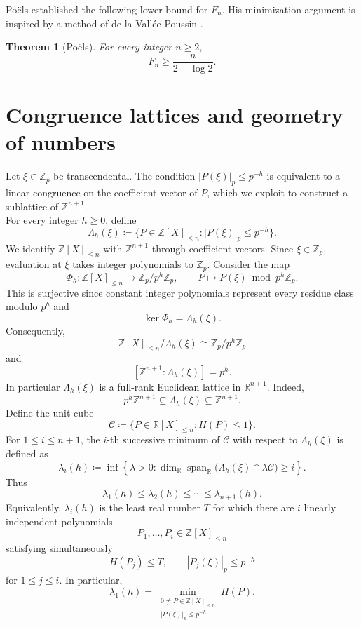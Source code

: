 \documentclass[10pt,a4paper]{amsart}
\newtheorem{theorem}{Theorem}[section]
\newcommand{\Z}{\mathbb Z}
\newcommand{\R}{\mathbb R}
\newcommand{\Zp}{\mathbb Z_p}
\newcommand{\Span}{\operatorname{span}}
\begin{document}
Po\"els \cite[Theorem~8.1]{PoelsWirsing} established the following lower
bound for $F_n$. His minimization argument is inspired by a method of de la
Vall\'ee Poussin \cite[Chapter~VI]{ValleePoussin}.
\begin{theorem}[Po\"els]\label{thm:optimization}
For every integer $n\geq2$,
$$
F_n\geq\frac{n}{2-\log 2}.
$$
\end{theorem}

\bigskip

\section{\bf Congruence lattices and geometry of numbers}
\bigskip


Let $\xi\in\Zp$ be transcendental. The condition
$|P(\xi)|_p\leq p^{-h}$ is equivalent to a linear congruence on the
coefficient vector of $P$, which we exploit to construct a sublattice of $\Z^{n+1}$.\\ 

For every integer $h\geq0$, define
$$
\Lambda_h(\xi)
\coloneqq
\{P\in\Z[X]_{\leq n}:|P(\xi)|_p\leq p^{-h}\}.
$$
We identify $\Z[X]_{\leq n}$ with $\Z^{n+1}$ through coefficient vectors. Since $\xi\in\Zp$, evaluation at $\xi$ takes integer polynomials to $\Zp$. Consider the map 
$$
\Phi_h:\Z[X]_{\leq n}\longrightarrow\Zp/p^h\Zp,
\qquad
P\longmapsto P(\xi)\bmod p^h\Zp.
$$
This is surjective since constant integer polynomials represent every residue class modulo $p^h$ and
$$
\ker\Phi_h=\Lambda_h(\xi).
$$
Consequently,
$$
\Z[X]_{\leq n}/\Lambda_h(\xi)
\cong
\Zp/p^h\Zp
$$
and
$$
[\Z^{n+1}:\Lambda_h(\xi)]=p^h.
$$
In particular $\Lambda_h(\xi)$ is a full-rank Euclidean lattice in $\R^{n+1}$. Indeed,
$$
p^h\Z^{n+1}\subseteq\Lambda_h(\xi)\subseteq\Z^{n+1}.
$$
Define the unit cube
$$
\mathcal C
\coloneqq
\{P\in\R[X]_{\leq n}:H(P)\leq 1\}.
$$
For $1\leq i\leq n+1$, the $i$-th successive minimum of $\mathcal C$ with respect to $\Lambda_h(\xi)$ is defined as
$$
\lambda_i(h)
\coloneqq
\inf\left\{
\lambda>0:
\dim_{\R}\Span_{\R}\bigl(\Lambda_h(\xi)\cap\lambda\mathcal C\bigr)\geq i
\right\}.
$$
Thus
$$
\lambda_1(h)\leq\lambda_2(h)\leq\cdots\leq\lambda_{n+1}(h).
$$
Equivalently, $\lambda_i(h)$ is the least real number $T$ for which there are $i$ linearly independent polynomials
$$
P_1,\ldots,P_i\in\Z[X]_{\leq n}
$$
satisfying simultaneously
$$
H(P_j)\leq T,
\qquad
|P_j(\xi)|_p\leq p^{-h}
$$
for $1\leq j\leq i$. In particular,
$$
\lambda_1(h)
=
\min_{\substack{0\neq P\in\Z[X]_{\leq n}\\ |P(\xi)|_p\leq p^{-h}}}H(P).
$$
\end{document}
